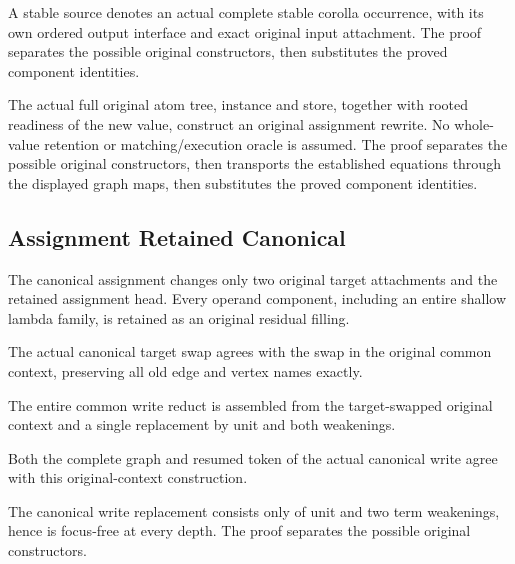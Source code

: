 A stable source denotes an actual complete stable corolla occurrence,
with its own ordered output interface and exact original input attachment.
The proof separates the possible original constructors, then substitutes the proved component identities.
\par{}

The actual full original atom tree, instance and store, together with
rooted readiness of the new value, construct an original assignment rewrite.
No whole-value retention or matching/execution oracle is assumed.
The proof separates the possible original constructors, then transports the established equations through the displayed graph maps, then substitutes the proved component identities.
\par{}

\subsection{Assignment Retained Canonical}
The canonical assignment changes only two original target attachments
and the retained assignment head. Every operand component, including an
entire shallow lambda family, is retained as an original residual filling.

The actual canonical target swap agrees with the swap in the original
common context, preserving all old edge and vertex names exactly.
\par{}

The entire common write reduct is assembled from the target-swapped
original context and a single replacement by unit and both weakenings.
\par{}

Both the complete graph and resumed token of the actual canonical write
agree with this original-context construction.
\par{}

The canonical write replacement consists only of unit and two term
weakenings, hence is focus-free at every depth.
The proof separates the possible original constructors.
\par{}

